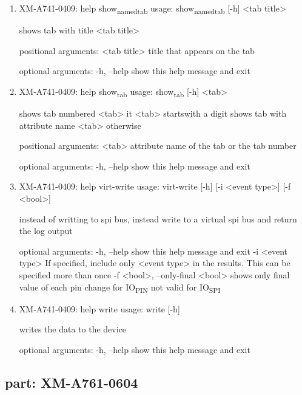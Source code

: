 \documentclass[11pt]{article}
\begin{document}
\begin{enumerate}
\item XM-A741-0409: help show\textsubscript{named}\textsubscript{tab}
\label{sec:orgad3de4a}
usage: show\textsubscript{named}\textsubscript{tab} [-h] <tab title>

shows tab with title <tab title>

positional arguments:
  <tab title>  title that appears on the tab

optional arguments:
  -h, --help   show this help message and exit

\item XM-A741-0409: help show\textsubscript{tab}
\label{sec:orgfdab23c}
usage: show\textsubscript{tab} [-h] <tab>

shows tab numbered <tab> it <tab> startswith a digit shows tab with attribute
name <tab> otherwise

positional arguments:
  <tab>       attribute name of the tab or the tab number

optional arguments:
  -h, --help  show this help message and exit

\item XM-A741-0409: help virt-write
\label{sec:orga508c3c}
usage: virt-write [-h] [-i <event type>] [-f <bool>]

instead of writting to spi bus, instead write to a virtual spi bus and return
the log output

optional arguments:
  -h, --help            show this help message and exit
  -i <event type>       If specified, include only <event type> in the
                        results. This can be specified more than once
  -f <bool>, --only-final <bool>
                        shows only final value of each pin change for IO\textsubscript{PIN}
                        not valid for IO\textsubscript{SPI}

\item XM-A741-0409: help write
\label{sec:orga90608e}
usage: write [-h]

writes the data to the device

optional arguments:
  -h, --help  show this help message and exit
\end{enumerate}

\subsection{part: XM-A761-0604}
\label{sec:org9651aec}
\end{document}
